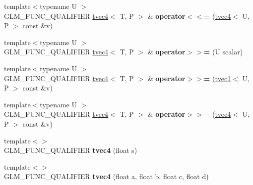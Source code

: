 \begin{DoxyCompactItemize}
\item 
\hypertarget{structglm_1_1tvec4_ab39a99917d9c3a7b93c1cf5cbfa93025}{{\footnotesize template$<$typename U $>$ }\\G\-L\-M\-\_\-\-F\-U\-N\-C\-\_\-\-Q\-U\-A\-L\-I\-F\-I\-E\-R \hyperlink{structglm_1_1tvec4}{tvec4}$<$ T, P $>$ \& {\bfseries operator$<$$<$=} (\hyperlink{structglm_1_1tvec4}{tvec4}$<$ U, P $>$ const \&v)}\label{structglm_1_1tvec4_ab39a99917d9c3a7b93c1cf5cbfa93025}

\item 
\hypertarget{structglm_1_1tvec4_a538540f7df0325aa90d503b150dfa561}{{\footnotesize template$<$typename U $>$ }\\G\-L\-M\-\_\-\-F\-U\-N\-C\-\_\-\-Q\-U\-A\-L\-I\-F\-I\-E\-R \hyperlink{structglm_1_1tvec4}{tvec4}$<$ T, P $>$ \& {\bfseries operator$>$$>$=} (U scalar)}\label{structglm_1_1tvec4_a538540f7df0325aa90d503b150dfa561}

\item 
\hypertarget{structglm_1_1tvec4_abfcea840ccebe4a644d60116955529ce}{{\footnotesize template$<$typename U $>$ }\\G\-L\-M\-\_\-\-F\-U\-N\-C\-\_\-\-Q\-U\-A\-L\-I\-F\-I\-E\-R \hyperlink{structglm_1_1tvec4}{tvec4}$<$ T, P $>$ \& {\bfseries operator$>$$>$=} (\hyperlink{structglm_1_1tvec1}{tvec1}$<$ U, P $>$ const \&v)}\label{structglm_1_1tvec4_abfcea840ccebe4a644d60116955529ce}

\item 
\hypertarget{structglm_1_1tvec4_aafc6289fa58e4d84390259bf8287cb72}{{\footnotesize template$<$typename U $>$ }\\G\-L\-M\-\_\-\-F\-U\-N\-C\-\_\-\-Q\-U\-A\-L\-I\-F\-I\-E\-R \hyperlink{structglm_1_1tvec4}{tvec4}$<$ T, P $>$ \& {\bfseries operator$>$$>$=} (\hyperlink{structglm_1_1tvec4}{tvec4}$<$ U, P $>$ const \&v)}\label{structglm_1_1tvec4_aafc6289fa58e4d84390259bf8287cb72}

\item 
\hypertarget{structglm_1_1tvec4_a833db8a3cf0fc86781041a4987f5614e}{{\footnotesize template$<$$>$ }\\G\-L\-M\-\_\-\-F\-U\-N\-C\-\_\-\-Q\-U\-A\-L\-I\-F\-I\-E\-R {\bfseries tvec4} (float s)}\label{structglm_1_1tvec4_a833db8a3cf0fc86781041a4987f5614e}

\item 
\hypertarget{structglm_1_1tvec4_af886976dafb2c4a25393079881c808df}{{\footnotesize template$<$$>$ }\\G\-L\-M\-\_\-\-F\-U\-N\-C\-\_\-\-Q\-U\-A\-L\-I\-F\-I\-E\-R {\bfseries tvec4} (float a, float b, float c, float d)}\label{structglm_1_1tvec4_af886976dafb2c4a25393079881c808df}


\end{DoxyCompactItemize}
